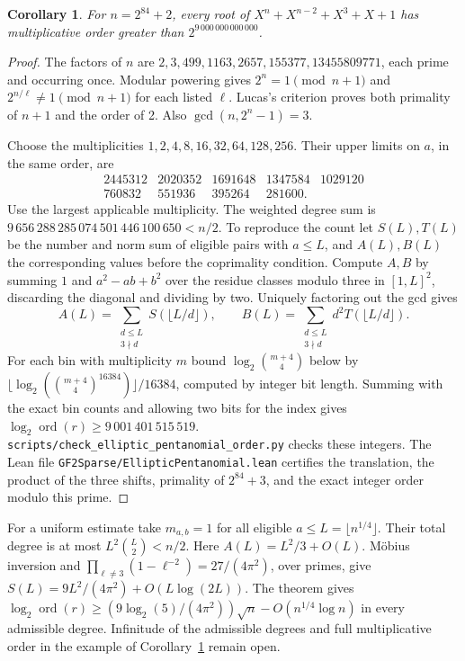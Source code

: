 \documentclass[11pt]{article}
\newtheorem{corollary}[theorem]{Corollary}
\newcommand{\ord}{\operatorname{ord}}
\begin{document}
\begin{corollary}\label{cor:elliptic-84}
For \(n=2^{84}+2\), every root of \(X^n+X^{n-2}+X^3+X+1\)
has multiplicative order greater than \(2^{9\,000\,000\,000\,000}\).
\end{corollary}
\begin{proof}
The factors of \(n\) are \(2,3,499,1163,2657,155377,13455809771\),
each prime and occurring once. Modular powering gives
\(2^n=1\pmod{n+1}\) and \(2^{n/\ell}\ne1\pmod{n+1}\) for each
listed \(\ell\). Lucas's criterion proves both primality of \(n+1\)
and the order of 2. Also \(\gcd(n,2^n-1)=3\).

Choose the multiplicities \(1,2,4,8,16,32,64,128,256\). Their upper
limits on \(a\), in the same order, are
\[
 \begin{array}{rrrrr}
 2445312&2020352&1691648&1347584&1029120\\
 760832&551936&395264&281600 .
 \end{array}
\]
Use the largest applicable multiplicity. The weighted degree sum is
\(9\,656\,288\,285\,074\,501\,446\,100\,650<n/2\).
To reproduce the count let \(S(L),T(L)\) be the number and norm sum
of eligible pairs with \(a\le L\), and \(A(L),B(L)\) the corresponding
values before the coprimality condition. Compute \(A,B\) by summing
\(1\) and \(a^2-ab+b^2\) over the residue classes modulo three in
\([1,L]^2\), discarding the diagonal and dividing by two. Uniquely
factoring out the gcd gives
\[
 A(L)=\sum_{\substack{d\le L\\3\nmid d}} S(\lfloor L/d\rfloor),
 \qquad
 B(L)=\sum_{\substack{d\le L\\3\nmid d}} d^2T(\lfloor L/d\rfloor).
\]
For each bin with multiplicity \(m\) bound \(\log_2\binom{m+4}{4}\)
below by \(\lfloor\log_2(\binom{m+4}{4}^{16384})\rfloor/16384\),
computed by integer bit length. Summing with the exact bin counts and
allowing two bits for the index gives \(\log_2\ord(r)\ge
9\,001\,401\,515\,519\).
\nolinkurl{scripts/check_elliptic_pentanomial_order.py} checks these
integers. The Lean file \nolinkurl{GF2Sparse/EllipticPentanomial.lean} certifies
the translation, the product of the three shifts, primality of
\(2^{84}+3\), and the exact integer order modulo this prime.
\end{proof}

For a uniform estimate take \(m_{a,b}=1\) for all eligible
\(a\le L=\lfloor n^{1/4}\rfloor\). Their total degree is at most
\(L^2\binom L2<n/2\). Here \(A(L)=L^2/3+O(L)\). M\"obius inversion
and \(\prod_{\ell\ne3}(1-\ell^{-2})=27/(4\pi^2)\), over primes,
give \(S(L)=9L^2/(4\pi^2)+O(L\log(2L))\). The theorem gives
\(\log_2\ord(r)\ge(9\log_2(5)/(4\pi^2))\sqrt n
-O(n^{1/4}\log n)\) in every admissible degree. Infinitude of
the admissible degrees and full multiplicative order in the example
of Corollary~\ref{cor:elliptic-84} remain open.
\end{document}

